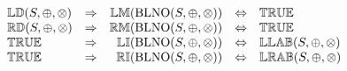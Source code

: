 \[
\begin{array}{lcrcl} 
\propname{LD}(S, \oplus, \otimes)
	& \Rightarrow
	& \propname{LM}(\mathrm{BLNO}(S,\oplus,\otimes))
    & \Leftrightarrow
    & \propname{TRUE} \\
\propname{RD}(S, \oplus, \otimes)
	& \Rightarrow
	& \propname{RM}(\mathrm{BLNO}(S,\oplus,\otimes))
    & \Leftrightarrow %
    & \propname{TRUE} \\
\propname{TRUE}
	& \Rightarrow
	& \propname{LI}(\mathrm{BLNO}(S,\oplus,\otimes))
    & \Leftrightarrow %
    & \propname{LLAB}(S,\oplus,\otimes) \\ 
\propname{TRUE}
	& \Rightarrow
	& \propname{RI}(\mathrm{BLNO}(S,\oplus,\otimes))
    & \Leftrightarrow %
    & \propname{LRAB}(S,\oplus,\otimes) \\
\end{array} 
\] 

